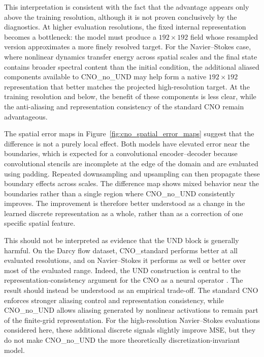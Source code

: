 This interpretation is consistent with the fact that the advantage appears only above the training resolution, although it is not proven conclusively by the diagnostics. At higher evaluation resolutions, the fixed internal representation becomes a bottleneck: the model must produce a \(192\times192\) field whose resampled version approximates a more finely resolved target. For the Navier--Stokes case, where nonlinear dynamics transfer energy across spatial scales and the final state contains broader spectral content than the initial condition, the additional aliased components available to CNO\_no\_UND may help form a native \(192\times192\) representation that better matches the projected high-resolution target. At the training resolution and below, the benefit of these components is less clear, while the anti-aliasing and representation consistency of the standard CNO remain advantageous.

The spatial error maps in Figure~\ref{fig:cno_spatial_error_maps} suggest that the difference is not a purely local effect. Both models have elevated error near the boundaries, which is expected for a convolutional encoder--decoder because convolutional stencils are incomplete at the edge of the domain and are evaluated using padding. Repeated downsampling and upsampling can then propagate these boundary effects across scales. The difference map shows mixed behavior near the boundaries rather than a single region where CNO\_no\_UND consistently improves. The improvement is therefore better understood as a change in the learned discrete representation as a whole, rather than as a correction of one specific spatial feature.

This should not be interpreted as evidence that the UND block is generally harmful. On the Darcy flow dataset, CNO\_standard performs better at all evaluated resolutions, and on Navier--Stokes it performs as well or better over most of the evaluated range. Indeed, the UND construction is central to the representation-consistency argument for the CNO as a neural operator \cite{bartolucci-discretization-invariance}. The result should instead be understood as an empirical trade-off. The standard CNO enforces stronger aliasing control and representation consistency, while CNO\_no\_UND allows aliasing generated by nonlinear activations to remain part of the finite-grid representation. For the high-resolution Navier--Stokes evaluations considered here, these additional discrete signals slightly improve MSE, but they do not make CNO\_no\_UND the more theoretically discretization-invariant model.

